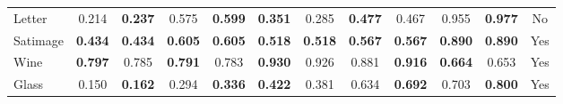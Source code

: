 \begin{table}[htbp]
\begin{tabular}{lccccccccccc}
Letter & 0.214 & \textbf{0.237} & 0.575 & \textbf{0.599} & \textbf{0.351} & 0.285 & \textbf{0.477} & 0.467 & 0.955 & \textbf{0.977} & No \\
Satimage & \textbf{0.434} & \textbf{0.434} & \textbf{0.605} & \textbf{0.605} & \textbf{0.518} & \textbf{0.518} & \textbf{0.567} & \textbf{0.567} & \textbf{0.890} & \textbf{0.890} & Yes \\
Wine & \textbf{0.797} & 0.785 & \textbf{0.791} & 0.783 & \textbf{0.930} & 0.926 & 0.881 & \textbf{0.916} & \textbf{0.664} & 0.653 & Yes \\
Glass & 0.150 & \textbf{0.162} & 0.294 & \textbf{0.336} & \textbf{0.422} & 0.381 & 0.634 & \textbf{0.692} & 0.703 & \textbf{0.800} & Yes \\
\bottomrule
\end{tabular}
\end{table}